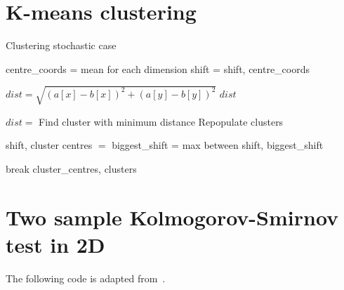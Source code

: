 \section{K-means clustering}
\begin{algorithm}
\label{alg:KMeans}
\caption{Clustering stochastic case}
 \begin{algorithmic}[1]
    \Statex
    
    
    	\Statex
    		\State centre\_coords =  mean for each dimension
    		\State shift = 
    		\State \Return shift, centre\_coords
    	\EndFunction
    
    	\Statex
    		\State $dist = \sqrt{(a[x] - b[x])^2+(a[y] - b[y])^2}$
    		\State \Return $dist$
    	\EndFunction
      
      	\Statex
      				\State $dist = $
      			\EndFor
      			\State Find cluster with minimum distance
      			\State Repopulate clusters
      		\EndFor
      		
      			\State shift, cluster centres $=$ 
      			\State biggest\_shift =  max between shift, biggest\_shift
      			
      		\EndFor
      			\State break
      		\EndIf
      	\EndWhile
      \State \Return cluster\_centres, clusters
    \EndFunction

  \end{algorithmic}
\end{algorithm}

\section{Two sample Kolmogorov-Smirnov test in 2D}
The following code is adapted from~\autocite{Syrtis2016}. 

